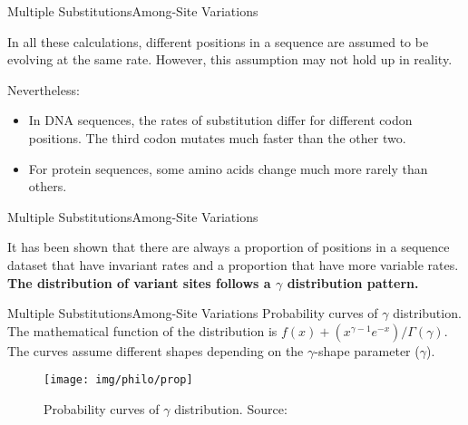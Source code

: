 \documentclass[10pt]{beamer}
\newcommand{\1}{
	\setbeamertemplate{background}{
		\texttt{[image: img/1]}
		\tikz[overlay] \fill[fill opacity=0.75,fill=white] (0,0) rectangle (-\paperwidth,\paperheight);
	}
}
\begin{document}
\begin{frame}{Multiple Substitutions}{Among-Site Variations}
	\begin{block}{}
		In all these calculations, different positions in a sequence are assumed to be evolving
		at the same rate. However, this assumption may not hold up in reality.
	\end{block}

	\begin{block}{}
		Nevertheless:
		\begin{itemize}
			\item In DNA sequences, the rates of substitution differ for different codon positions. The	third codon mutates much faster than the other two.	
			\item For protein sequences, some amino acids change much more rarely than others.
		\end{itemize}

	\end{block}
\end{frame}

\begin{frame}{Multiple Substitutions}{Among-Site Variations}
	\begin{block}{}
		It has been shown that there are always a proportion of positions in a sequence
		dataset that have invariant rates and a proportion that have more variable rates.
		\textbf{The distribution of variant sites follows a $\gamma$ distribution pattern.}
	\end{block}
\end{frame}

\begin{frame}{Multiple Substitutions}{Among-Site Variations}
	Probability curves of $\gamma$ distribution. The mathematical function of the distribution is
	$f(x) + (x^{\gamma-1} e^{-x} )/ \Gamma(\gamma)$. The curves assume different shapes depending on the $\gamma$-shape parameter ($\gamma$).
	
	\begin{figure}
		\texttt{[image: img/philo/prop]}
		\caption{Probability curves of $\gamma$ distribution.
			Source: \cite{xiong2006essential}}			
	\end{figure}
\end{frame}
\end{document}
